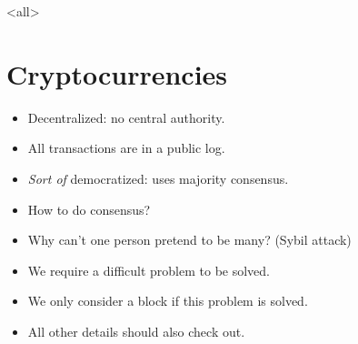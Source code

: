 \mode*

\mode<all>{}


\section{Cryptocurrencies}

\begin{frame}
  \begin{idea}
    \begin{itemize}
      \item Decentralized: no central authority.
      \item All transactions are in a public log.
      \item \emph{Sort of} democratized: uses majority consensus.
    \end{itemize}
  \end{idea}
\end{frame}

\begin{frame}
  \begin{question}
    \begin{itemize}
      \item How to do consensus?
      \item Why can't one person pretend to be many? (Sybil attack)
    \end{itemize}
  \end{question}

  \begin{idea}
    \begin{itemize}
      \item We require a difficult problem to be solved.
      \item We only consider a block if this problem is solved.
      \item All other details should also check out.
    \end{itemize}
  \end{idea}
\end{frame}


